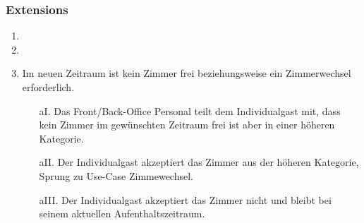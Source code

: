 \documentclass[./detailed_overview_usecases.tex]{subfiles}
\begin{document}
    \subsubsection*{Extensions}
    \begin{enumerate}
        \item 
		\item 
		\item Im neuen Zeitraum ist kein Zimmer frei beziehungsweise ein Zimmerwechsel erforderlich.
        \begin{itemize}
                       \item[aI.] Das Front/Back-Office Personal teilt dem Individualgast mit, dass kein Zimmer im gewünschten Zeitraum frei ist aber in einer höheren Kategorie.
					   \item[aII.] Der Individualgast akzeptiert das Zimmer aus der höheren Kategorie, Sprung zu Use-Case Zimmewechsel.
					   \item[aIII.] Der Individualgast akzeptiert das Zimmer nicht und bleibt bei seinem aktuellen Aufenthaltszeitraum.

        \end{itemize}
    \end{enumerate}
\end{document}
